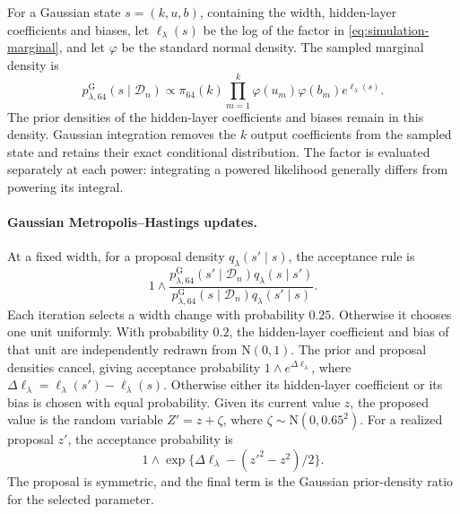 \documentclass[11pt,a4paper]{article}
\theoremstyle{remark}
\newcommand{\Dcal}{\mathcal D}
\begin{document}
\begingroup
For a Gaussian state $s=(k,u,b)$, containing the width,
hidden-layer coefficients and biases, let
$\ell_\lambda(s)$ be the log of the factor in
\eqref{eq:simulation-marginal}, and let $\varphi$ be the standard
normal density. The sampled marginal density is
\[
p^{\mathrm G}_{\lambda,64}(s\mid\Dcal_n)\propto
\pi_{64}(k)\prod_{m=1}^k\varphi(u_m)\varphi(b_m)
e^{\ell_\lambda(s)}.
\]
The prior densities of the hidden-layer coefficients and biases remain in this density. Gaussian
integration removes the $k$ {output coefficients} from the sampled
state and retains their exact conditional distribution.
The factor is evaluated separately at each power: integrating a
powered likelihood generally differs from powering its integral.

\paragraph{Gaussian Metropolis--Hastings updates.}
At a fixed width, for a proposal density $q_\lambda(s'\mid s)$,
the acceptance rule is
\[
1\wedge
\frac{p^{\mathrm G}_{\lambda,64}(s'\mid\Dcal_n)
q_\lambda(s\mid s')}
{p^{\mathrm G}_{\lambda,64}(s\mid\Dcal_n)
q_\lambda(s'\mid s)}.
\]
Each iteration selects a width change with probability $0.25$.
Otherwise it chooses one unit uniformly. With probability $0.2$,
the hidden-layer coefficient and bias of that unit are independently redrawn
from $\mathrm N(0,1)$. The prior and proposal densities cancel,
giving acceptance probability $1\wedge e^{\Delta\ell_\lambda}$,
where $\Delta\ell_\lambda=\ell_\lambda(s')-\ell_\lambda(s)$.
Otherwise either its hidden-layer coefficient or its bias is chosen
with equal probability. Given its current value $z$, the proposed value
is the random variable $Z'=z+\zeta$, where
$\zeta\sim\mathrm N(0,0.65^2)$. For a realized proposal $z'$, the
acceptance probability is
\[
1\wedge\exp\{\Delta\ell_\lambda-(z'^2-z^2)/2\}.
\]
The proposal is symmetric, and the final term is the Gaussian
prior-density ratio for the selected parameter.
\end{document}
